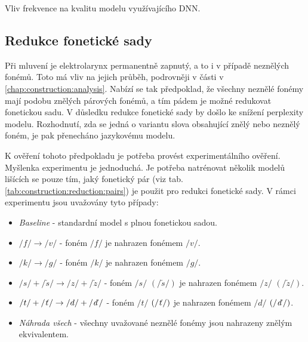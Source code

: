 \begin{table}[htpb]
  \centering
  \def\arraystretch{1.5}
  \caption{Vliv frekvence na kvalitu modelu využívajícího DNN.}
  \label{tab:construction:experiment:dnn}
\end{table}

\subsection{Redukce fonetické sady}
\label{chap:construction:results:reduction}

Při mluvení je elektrolarynx permanentně zapnutý, a to i v případě neznělých fonémů.
Toto má vliv na jejich průběh, podrovněji v části v \ref{chap:construction:analysis}.
Nabízí se tak předpoklad, že všechny neznělé fonémy mají podobu znělých párových fonémů, a tím pádem je možné redukovat fonetickou sadu.
V důsledku redukce fonetické sady by došlo ke snížení perplexity modelu.
Rozhodnutí, zda se jedná o variantu slova obsahující znělý nebo neznělý foném, je pak přenecháno jazykovému modelu.

K ověření tohoto předpokladu je potřeba provést experimentálního ověření.
Myšlenka experimentu je jednoduchá.
Je potřeba natrénovat několik modelů lišících se pouze tím, jaký fonetický pár (viz tab. \ref{tab:construction:reduction:pairs}) je použit pro redukci fonetické sady.
V rámci experimentu jsou uvažovány tyto případy:

\begin{itemize}
  \item \textit{Baseline} - standardní model s plnou fonetickou sadou.
  \item $/f/ \rightarrow /v/$ - foném $/f/$ je nahrazen fonémem $/v/$.
  \item $/k/ \rightarrow /g/$ - foném $/k/$ je nahrazen fonémem $/g/$.
  \item $/s/+/\check{s}/ \rightarrow /z/+/\check{z}/$ - foném $/s/$ $\left(/\check{s}/\right)$ je nahrazen fonémem $/z/$ $\left(/\check{z}/\right)$.
  \item $/t/+/\text{\textit{ť}}/ \rightarrow /d/+/\text{\textit{ď}}/$ - foném $/t/$ $\left(/\text{\textit{ť}}/\right)$ je nahrazen fonémem $/d/$ $\left(/\text{\textit{ď}}/\right)$.
  \item \textit{Náhrada všech} - všechny uvažované neznělé fonémy jsou nahrazeny znělým ekvivalentem.
\end{itemize}

